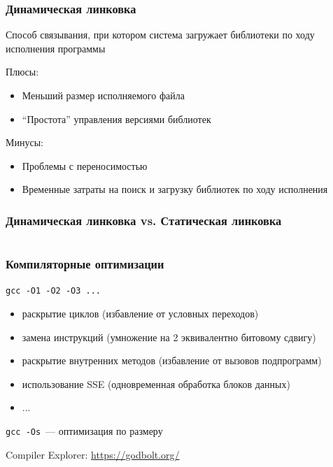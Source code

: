 \documentclass[aspectratio=169]{beamer}
\begin{document}
\begin{frame}
    \frametitle{Динамическая линковка}

    Способ связывания, при котором система загружает библиотеки по ходу исполнения программы

    Плюсы:
    \begin{itemize}
        \item Меньший размер исполняемого файла
        \item \enquote{Простота} управления версиями библиотек
    \end{itemize}
    Минусы:
    \begin{itemize}
        \item Проблемы с переносимостью
        \item Временные затраты на поиск и загрузку библиотек по ходу исполнения
    \end{itemize}
\end{frame}

\begin{frame}
    \frametitle{Динамическая линковка vs. Статическая линковка}

    \inputminted[breaklines]{console}{sizes.txt}

\end{frame}

\begin{frame}
    \frametitle{Компиляторные оптимизации}

    \texttt{gcc -O1 -O2 -O3 ...}

    \begin{itemize}
        \item раскрытие циклов (избавление от условных переходов)
        \item замена инструкций (умножение на 2 эквивалентно битовому сдвигу)
        \item раскрытие внутренних методов (избавление от вызовов подпрограмм)
        \item использование SSE (одновременная обработка блоков данных)
        \item ...
    \end{itemize}

    \texttt{gcc -Os}~--- оптимизация по размеру

    Compiler Explorer: \url{https://godbolt.org/}

\end{frame}
\end{document}
